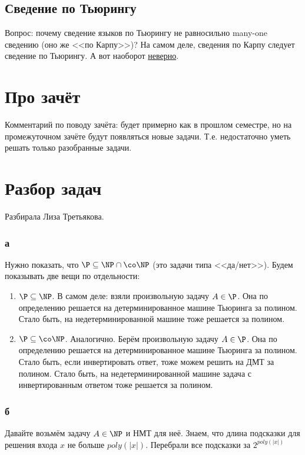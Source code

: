 \subsection{Сведение по Тьюрингу}
	Вопрос: почему сведение языков по Тьюрингу не равносильно many-one сведению (оно же <<по Карпу>>)?
	На самом деле, сведения по Карпу следует сведение по Тьюрингу.
	А вот наоборот \hyperref[task_14_rem_turing]{неверно}.

\section{Про зачёт}
	Комментарий по поводу зачёта: будет примерно как в прошлом семестре, но на промежуточном
	зачёте будут появляться новые задачи.
	Т.е. недостаточно уметь решать только разобранные задачи.

\section{Разбор задач}
	Разбирала Лиза Третьякова.

	\subsubsection{а}
		Нужно показать, что $\P \subseteq \NP \cap \co\NP$ (это задачи типа <<да/нет>>).
		Будем показывать две вещи по отдельности:
		\begin{enumerate}
			\item
				$\P \subseteq \NP$.
				В самом деле: взяли произвольную задачу $A \in \P$.
				Она по определению решается на детерминированное машине Тьюринга за полином.
				Стало быть, на недетерминированной машине тоже решается за полином.
			\item
				$\P \subseteq \co\NP$.
				Аналогично.
				Берём произвольную задачу $A \in \P$.
				Она по определению решается на детерминированное машине Тьюринга за полином.
				Стало быть, если инвертировать ответ, тоже можем решить на ДМТ за полином.
				Стало быть, на недетерминированной машине задача с инвертированным ответом тоже решается за полином.
		\end{enumerate}

	\subsubsection{б}
		Давайте возьмём задачу $A \in \NP$ и НМТ для неё.
		Знаем, что длина подсказки для решения входа $x$ не больше $poly(|x|)$.
		Перебрали все подсказки за $2^{poly(|x|)}$

